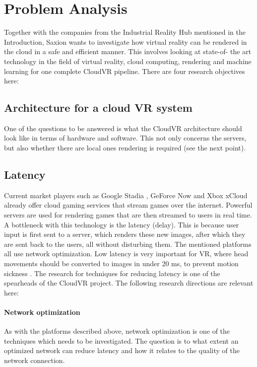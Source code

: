 \section{Problem Analysis}

Together with the companies from the Industrial Reality Hub mentioned in the Introduction, Saxion wants to investigate how virtual reality
can be rendered in the cloud in a safe and efficient manner. This involves looking at state-of-
the art technology in the field of virtual reality, cloud computing, rendering and machine learning for one
complete CloudVR pipeline. There are four research objectives here:

\subsection{Architecture for a cloud VR system}
One of the questions to be answered is what the CloudVR architecture should look like
in terms of hardware and software. This not only concerns the servers, but also whether there are local ones
rendering is required (see the next point).

\subsection{Latency}
Current market players such as Google Stadia \parencite{stadia}, GeForce Now \parencite{geforcenow} and Xbox xCloud \parencite{xcloud} already offer cloud gaming services that stream games over the internet. Powerful servers are used for rendering games that are then streamed to users in real time. A bottleneck with this technology is the latency (delay). This is because user input is first sent to a server, which renders these new images, after which they are sent back to the users, all without disturbing them. The mentioned platforms all use network optimization. Low latency is very important for VR, where head movements should be converted to images in under 20 \acrfull{ms}, to prevent motion sickness \parencite{valvevrlatency}. The research for techniques for reducing latency is one of the spearheads of the CloudVR project. The following research directions are relevant here:

\paragraph{Network optimization}
As with the platforms described above, network optimization is one of the techniques
which needs to be investigated. The question is to what extent an optimized network
can reduce latency and how it relates to the quality of the network connection.

